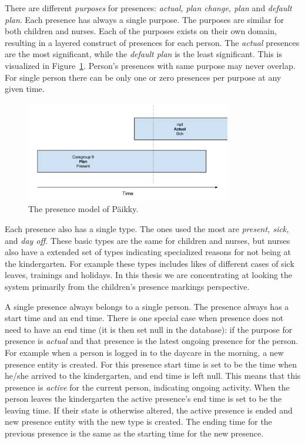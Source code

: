 There are different \textit{purposes} for presences: \textit{actual, plan change, plan} and \textit{default plan}. Each presence has always a single purpose. The purposes are similar for both children and nurses. Each of the purposes exists on their own domain, resulting in a layered construct of presences for each person. The \textit{actual} presences are the most significant, while the \textit{default plan} is the least significant. This is visualized in Figure~\ref{fig:presencemodel}. Person's presences with same purpose may never overlap. For single person there can be only one or zero presences per purpose at any given time.

\begin{figure}[t]
\begin{center}
\includegraphics[width=0.8\textwidth]{assets/presencemodel.png}
\end{center}
\caption{The presence model of Päikky.}
\label{fig:presencemodel}
\end{figure}


Each presence also has a single type. The ones used the most are \textit{present, sick,} and \textit{day off.} These basic types are the same for children and nurses, but nurses also have a extended set of types indicating specialized reasons for not being at the kindergarten. For example these types includes likes of different cases of sick leaves, trainings and holidays. In this thesis we are concentrating at looking the system primarily from the children's presence markings perspective.

A single presence always belongs to a single person. The presence always has a start time and an end time. There is one special case when presence does not need to have an end time (it is then set null in the database): if the purpose for presence is \textit{actual} and that presence is the latest ongoing presence for the person. For example when a person is logged in to the daycare in the morning, a new presence entity is created. For this presence start time is set to be the time when he/she arrived to the kindergarten, and end time is left null. This means that this presence is \textit{active} for the current person, indicating ongoing activity. When the person leaves the kindergarten the active presence's end time is set to be the leaving time. If their state is otherwise altered, the active presence is ended and new presence entity with the new type is created. The ending time for the previous presence is the same as the starting time for the new presence. 




